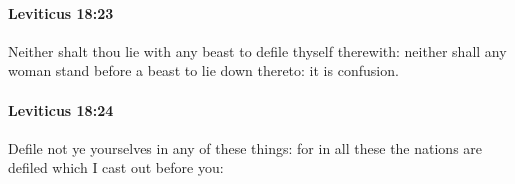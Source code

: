 		\paragraph{Leviticus 18:23} %
			\label{LEVITICUS-18-23}

			Neither shalt thou lie with any beast to defile thyself therewith: neither shall any woman stand before a beast to lie down thereto: it is confusion.


		\paragraph{Leviticus 18:24} %
			\label{LEVITICUS-18-24}

			Defile not ye yourselves in any of these things: for in all these the nations are defiled which I cast out before you:


